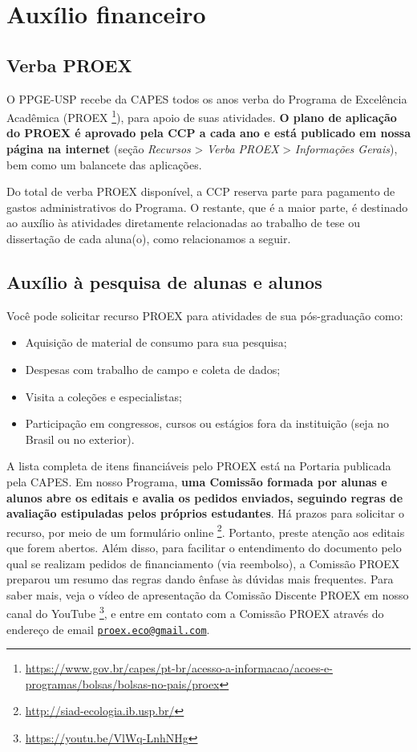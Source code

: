 \section{Auxílio financeiro}

\subsection{Verba PROEX}

O PPGE-USP recebe da CAPES todos os anos verba do Programa de
Excelência Acadêmica (PROEX
\footnote{\url{https://www.gov.br/capes/pt-br/acesso-a-informacao/acoes-e-programas/bolsas/bolsas-no-pais/proex}}),
para apoio de suas atividades. \textbf{O plano de aplicação do PROEX é
  aprovado pela CCP a cada ano e está publicado em nossa página na
  internet} (seção \emph{Recursos} \textgreater{} \emph{Verba PROEX} \textgreater{}
\emph{Informações Gerais}), bem como um balancete das aplicações.

Do total de verba PROEX disponível, a CCP reserva parte para pagamento
de %
gastos administrativos do Programa. O restante, que é a maior parte, é
destinado ao auxílio às atividades diretamente relacionadas ao
trabalho de tese ou dissertação de cada aluna(o), como relacionamos a
seguir.

\subsection{Auxílio à pesquisa de alunas e alunos
}\label{auxilio-pesquisa-de-alunas-e-alunos}

Você pode solicitar recurso PROEX para atividades de sua pós-graduação como:

\begin{itemize}
\item Aquisição de material de consumo para sua pesquisa;
\item Despesas com trabalho de campo e coleta de dados;
\item Visita a coleções e especialistas;
\item Participação em congressos, cursos ou estágios fora da
  instituição (seja no Brasil ou no exterior).
\end{itemize}

A lista completa de itens financiáveis pelo PROEX está na Portaria
publicada pela CAPES. Em nosso Programa, \textbf{uma Comissão formada
  por alunas e alunos abre os editais e avalia os pedidos enviados,
  seguindo regras de avaliação estipuladas pelos próprios
  estudantes}. Há prazos para solicitar o recurso, por meio de um
formulário online \footnote{\url{http://siad-ecologia.ib.usp.br/}}.
Portanto, preste atenção aos editais que forem abertos. Além disso,
para facilitar o entendimento do documento pelo qual se realizam
pedidos de financiamento (via reembolso), a Comissão PROEX preparou um
resumo das regras dando ênfase às dúvidas mais frequentes. Para saber
mais, veja o vídeo de apresentação da Comissão Discente PROEX em nosso
canal do YouTube \footnote{\url{https://youtu.be/VlWq-LnhNHg}}, e
entre em contato com a Comissão PROEX através do endereço de email
\href{mailto:proex.eco@gmail.com}{\nolinkurl{proex.eco@gmail.com}}.

